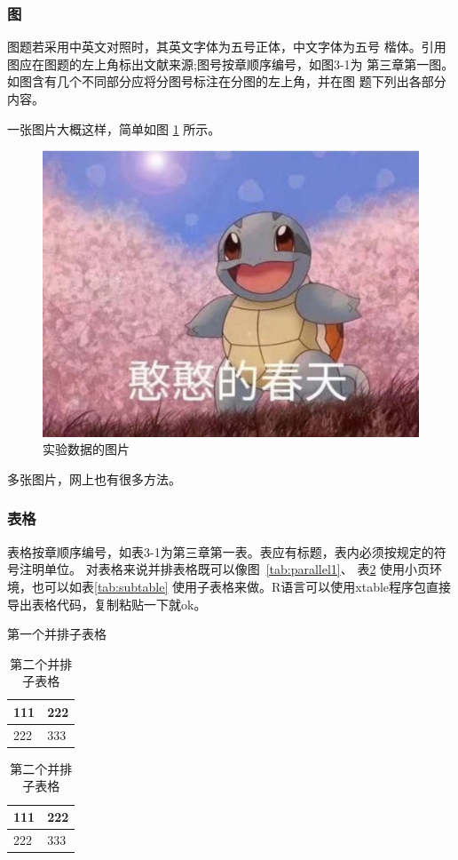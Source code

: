 \documentclass{SUFEThesis}
\begin{document}
\subsubsection{图}
图题若采用中英文对照时，其英文字体为五号正体，中文字体为五号 楷体。引用图应在图题的左上角标出文献来源;图号按章顺序编号，如图3-1为 第三章第一图。如图含有几个不同部分应将分图号标注在分图的左上角，并在图 题下列出各部分内容。\par
一张图片大概这样，简单如图 \ref{fig:hanhan} 所示。
\begin{figure}[!ht]
  \centering
  \includegraphics[width=0.45\linewidth]{图片1.jpg}
  \caption{实验数据的图片}
  \label{fig:hanhan}
\end{figure} 
多张图片，网上也有很多方法。
\subsubsection{表格}
表格按章顺序编号，如表3-1为第三章第一表。表应有标题，表内必须按规定的符号注明单位。
对表格来说并排表格既可以像图~\ref{tab:parallel1}、
表\ref{tab:parallel2} 使用小页环境，也可以如表\ref{tab:subtable} 使用子表格来做。R语言可以使用xtable程序包直接导出表格代码，复制粘贴一下就ok。

\begin{table}[htbp]
\noindent\begin{minipage}{0.5\textwidth}
\centering
\caption{第一个并排子表格}
\label{tab:parallel1}
\begin{tabular}{p{2cm}p{2cm}}
\toprule
111 & 222 \\\midrule
222 & 333 \\\bottomrule
\end{tabular}
\end{minipage}%
\begin{minipage}{0.5\textwidth}
\centering
\caption{第二个并排子表格}
\label{tab:parallel2}
\begin{tabular}{p{2cm}p{2cm}}
\toprule
111 & 222 \\\midrule
222 & 333 \\\bottomrule
\end{tabular}
\end{minipage}
\end{table}
\end{document}
